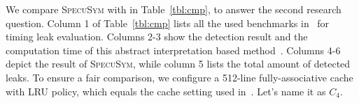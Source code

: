 \documentclass[sigconf]{acmart}
\newcommand{\SpecuSym}{\textsc{SpecuSym} }
\begin{document}
\begin{table}
\caption{Comparison betwee Wu et al~\cite{WuW19} and \SpecuSym}
\label{tbl:cmp}
\centering
{}
\vspace{-2ex}
\end{table}



We compare \SpecuSym with \cite{WuW19} in Table~\ref{tbl:cmp}, to answer the 
second research question. Column 1 of Table~\ref{tbl:cmp} lists all the used
benchmarks in~\cite{WuW19} for timing leak evaluation. Columns 2-3 show the 
detection result and the computation time of this abstract interpretation 
based method~\cite{WuW19}. Columns 4-6 depict the result of \textsc{SpecuSym}, 
while column 5 lists the total amount of detected leaks. To ensure a fair 
comparison, we configure a 512-line fully-associative cache with LRU policy, 
which equals the cache setting used in~\cite{WuW19}. Let's name it as $C_4$.
\end{document}
